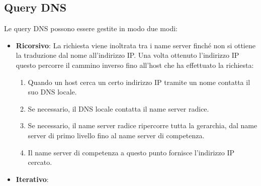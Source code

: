 \subsection{Query DNS}
Le query DNS possono essere gestite in modo due modi:
\begin{itemize}
	\item \textbf{Ricorsivo}:
		La richiesta viene inoltrata tra i name server finché non si ottiene la traduzione dal nome
		all'indirizzo IP. Una volta ottenuto l'indirizzo IP questo percorre il cammino inverso fino
		all'host che ha effettuato la richiesta:
		\begin{enumerate}
			\item Quando un host cerca un certo indirizzo IP tramite un nome contatta il suo DNS
				locale.
			\item Se necessario, il DNS locale contatta il name server radice.
			\item Se necessario, il name server radice ripercorre tutta la gerarchia, dal name
				server di primo livello fino al name server di competenza.
			\item Il name server di competenza a questo punto fornisce l'indirizzo IP cercato.
		\end{enumerate}
	\item \textbf{Iterativo}:
\end{itemize}

